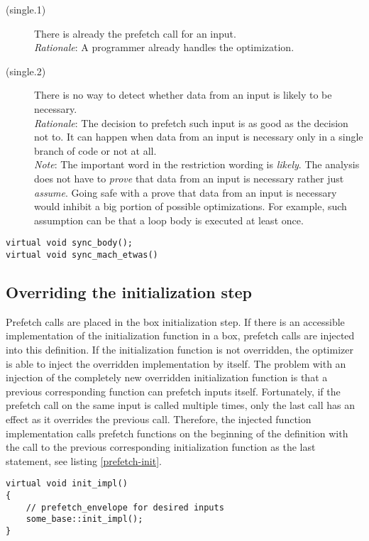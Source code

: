 \begin{description}
\item[(single.1)]{There is already the prefetch call for an input.\\
\emph{Rationale}: A programmer already handles the optimization.
}

\item[(single.2)]{There is no way to detect whether data from an input is likely to be necessary.\\
\emph{Rationale}: The decision to prefetch such input is as good as the decision not to. It can happen when data from an input is necessary only in a single branch of code or not at all.\\
\emph{Note}: The important word in the restriction wording is \emph{likely}. The analysis does not have to \emph{prove} that data from an input is necessary rather just \emph{assume}. Going safe with a prove that data from an input is necessary would inhibit a big portion of possible optimizations. For example, such assumption can be that a loop body is executed at least once.
}
\end{description}

\begin{lstlisting}[caption={Member functions representing the action step.},label={box-body}]
virtual void sync_body();
virtual void sync_mach_etwas()
\end{lstlisting}

\subsection{Overriding the initialization step}
Prefetch calls are placed in the box initialization step. If there is an accessible implementation of the initialization function in a box, prefetch calls are injected into this definition. If the initialization function is not overridden, the optimizer is able to inject the overridden implementation by itself. The problem with an injection of the completely new overridden initialization function is that a previous corresponding function can prefetch inputs itself. Fortunately, if the prefetch call on the same input is called multiple times, only the last call has an effect as it overrides the previous call. Therefore, the injected function implementation calls prefetch functions on the beginning of the definition with the call to the previous corresponding initialization function as the last statement, see listing \ref{prefetch-init}.

\begin{lstlisting}[caption={The generated box initialization function definition.}, label={prefetch-init}]
virtual void init_impl()
{
    // prefetch_envelope for desired inputs
    some_base::init_impl();
}
\end{lstlisting}

